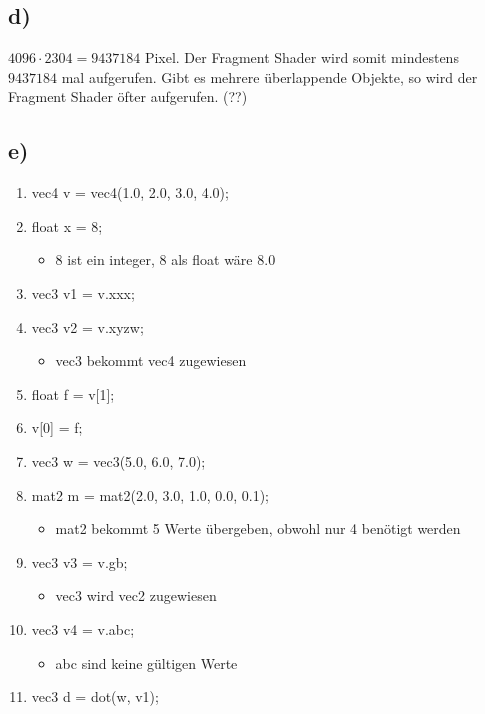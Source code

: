 \documentclass{article}
\begin{document}
\subsection*{d)}
$4096 \cdot 2304 = 9437184$ Pixel. Der Fragment Shader wird somit mindestens $9437184$ mal aufgerufen.
Gibt es mehrere überlappende Objekte, so wird der Fragment Shader öfter aufgerufen. (??)


\subsection*{e)}
\begin{enumerate}
    \item vec4 v = vec4(1.0, 2.0, 3.0, 4.0);
    \item float x = 8;
          \begin{itemize}
              \item 8 ist ein integer, 8 als float wäre 8.0
          \end{itemize}
    \item vec3 v1 = v.xxx;
    \item vec3 v2 = v.xyzw;
          \begin{itemize}
              \item vec3 bekommt vec4 zugewiesen
          \end{itemize}
    \item float f = v[1];
    \item v[0] = f;
    \item vec3 w = vec3(5.0, 6.0, 7.0);
    \item mat2 m = mat2(2.0, 3.0, 1.0, 0.0, 0.1);
          \begin{itemize}
              \item mat2 bekommt 5 Werte übergeben, obwohl nur 4 benötigt werden
          \end{itemize}
    \item vec3 v3 = v.gb;
          \begin{itemize}
              \item vec3 wird vec2 zugewiesen
          \end{itemize}
    \item vec3 v4 = v.abc;
          \begin{itemize}
              \item abc sind keine gültigen Werte
          \end{itemize}
    \item vec3 d = dot(w, v1);
          \begin{itemize}

\end{itemize}
\end{enumerate}
\end{document}
